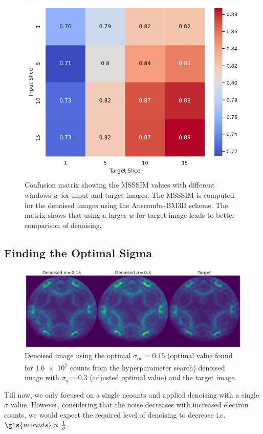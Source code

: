 \begin{figure}
    \centering
    \includegraphics[width=0.5\linewidth]{images/confusion_matrix_msssim_window_avg.pdf}
    \caption{Confusion matrix showing the \gls{MSSSIM} values with different windows $w$ for input and target images. The \gls{MSSSIM} is computed for the denoised images using the Anscombe-BM3D scheme. The matrix shows that using a larger $w$ for target image leads to better comparison of denoising.}
    \label{fig:confusion_matrix_msssim_window_avg}
\end{figure}

\subsection{Finding the Optimal Sigma}
\begin{figure}
    \centering
    \includegraphics[width=1\linewidth]{images/denoised_optimal_sigma.pdf}
    \caption{Denoised image using the optimal $\sigma_{\text{oo}}=0.15$ (optimal value found for \num{1.6e7} counts from the hyperparameter search) denoised image with $\sigma_{\text{o}}=0.3$ (adjusted optimal value) and the target image.}
    \label{fig:denoised-optimal-sigma}
\end{figure}
Till now, we only focused on a single \gls{ncounts} and applied denoising with a single $\sigma$ value. However, considering that the noise decreases with increased electron counts, we would expect the required level of denoising to decrease i.e. $\gls{ncounts}\propto\frac{1}{\sigma}$.

